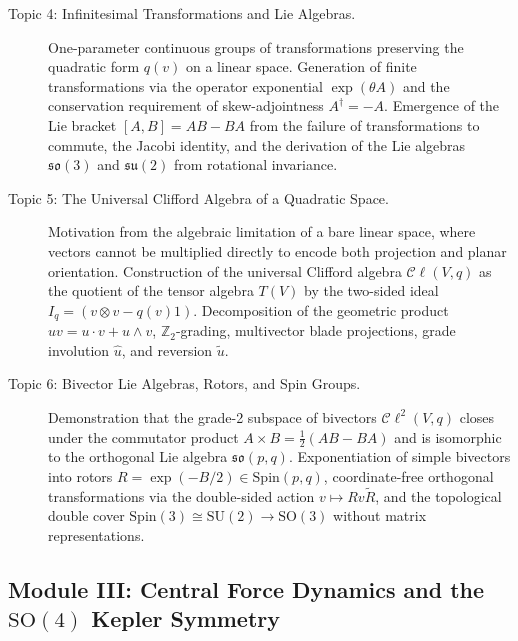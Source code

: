\documentclass[11pt,a4paper]{article}
\newcommand{\Cl}{\mathcal{C}\ell}
\newcommand{\Z}{\mathbb{Z}}
\begin{document}
\begin{description}
  \item[Topic 4: Infinitesimal Transformations and Lie Algebras.]
    One-parameter continuous groups of transformations preserving the quadratic
    form $q(v)$ on a linear space. Generation of finite transformations via the
    operator exponential $\exp(\theta A)$ and the conservation requirement of
    skew-adjointness $A^{\dagger} = -A$. Emergence of the Lie bracket
    $[A,B] = AB - BA$ from the failure of transformations to commute, the
    Jacobi identity, and the derivation of the Lie algebras $\mathfrak{so}(3)$
    and $\mathfrak{su}(2)$ from rotational invariance.

  \item[Topic 5: The Universal Clifford Algebra of a Quadratic Space.]
    Motivation from the algebraic limitation of a bare linear space, where
    vectors cannot be multiplied directly to encode both projection and planar
    orientation. Construction of the universal Clifford algebra $\Cl(V,q)$ as
    the quotient of the tensor algebra $T(V)$ by the two-sided ideal
    $I_{q} = ( v \otimes v - q(v)1 )$. Decomposition of the
    geometric product $uv = u \cdot v + u \wedge v$, $\Z_{2}$-grading,
    multivector blade projections, grade involution $\hat{u}$, and reversion
    $\tilde{u}$.

  \item[Topic 6: Bivector Lie Algebras, Rotors, and Spin Groups.]
    Demonstration that the grade-2 subspace of bivectors $\Cl^{2}(V,q)$ closes
    under the commutator product $A \times B = \frac{1}{2}(AB - BA)$ and is
    isomorphic to the orthogonal Lie algebra $\mathfrak{so}(p,q)$.
    Exponentiation of simple bivectors into rotors
    $R = \exp(-B/2) \in \mathrm{Spin}(p,q)$, coordinate-free orthogonal
    transformations via the double-sided action $v \mapsto Rv\tilde{R}$, and
    the topological double cover $\mathrm{Spin}(3) \cong \mathrm{SU}(2) \to
    \mathrm{SO}(3)$ without matrix representations.
\end{description}

\subsection{Module III: Central Force Dynamics and the
  \texorpdfstring{$\mathrm{SO}(4)$}{SO(4)} Kepler Symmetry}
\label{subsec:mod3}
\end{document}
